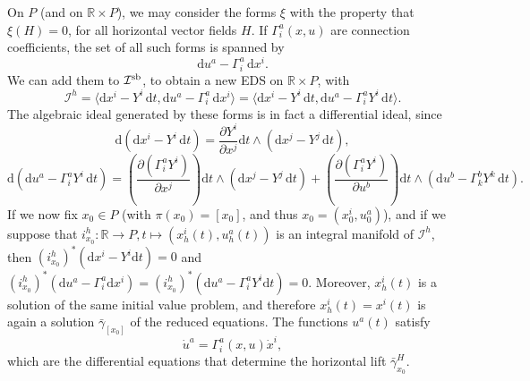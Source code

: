 \documentclass[11pt]{article}
\theoremstyle{plain}
\theoremstyle{definition}
\begin{document}
On $P$ (and on $\mathbb R \times P$), we may consider the forms $\xi$ with the property that $\xi(H)=0$, for all horizontal vector fields $H$. If $\Gamma^a_i(x,u)$ are connection coefficients, the set of all such forms is spanned by
\begin{equation*}
    {\mathrm d}u^a - \Gamma^a_i \, {\mathrm d}x^i.
\end{equation*}
We can add them to ${\mathcal I}^{\rm{sb}}$, to obtain a new EDS on $\mathbb R \times P$, with
\begin{equation*}
    {\mathcal I}^{h} = \langle   {\mathrm d}x^i-Y^i \, {\mathrm d}t,  {\mathrm d}u^a - \Gamma^a_i \, {\mathrm d}x^i\rangle =   \langle   {\mathrm d}x^i-Y^i \, {\mathrm d}t,  {\mathrm d}u^a - \Gamma^a_iY^i \, {\mathrm d}t\rangle .
\end{equation*}
The algebraic ideal generated by these forms is in fact a differential ideal, since
\begin{equation*}
    \mathrm{d}({\mathrm d}x^i-Y^i \, {\mathrm d}t) =  \frac{\partial Y^i}{\partial x^j}   {\mathrm d}t \wedge \left({\mathrm d}x^j-Y^j \, {\mathrm d}t\right),
\end{equation*}
\begin{equation*}
    {\mathrm d}\left( {\mathrm d}u^a - \Gamma^a_iY^i \, {\mathrm d}t \right) = \left( \frac{\partial (\Gamma^a_iY^i)}{\partial x^j} \right){\mathrm d}t \wedge \left({\mathrm d}x^j -Y^j \, {\mathrm d}t\right) +\left( \frac{\partial(\Gamma^a_iY^i)}{\partial u^b} \right){\mathrm d}t\wedge \left({\mathrm d}u^b - \Gamma^b_kY^k \, {\mathrm d}t\right). 
\end{equation*}
If we now fix $x_0\in P$ (with $\pi(x_0)=[x_0]$, and thus $x_0=(x^i_0,u^a_0)$), and if we suppose that $i^h_{x_0}\colon \mathbb R \to P, t \mapsto (x^i_h(t), u^a_h(t)) $ is an integral manifold of ${\mathcal I}^{h}$, then $(i^h_{x_0})^{\ast} ({\mathrm d}x^i-Y^i  {\mathrm d}t) = 0$ and $(i^h_{x_0})^{\ast} ({\mathrm d}u^a - \Gamma^a_i{\mathrm d}x^i) = (i^h_{x_0})^{\ast} ({\mathrm d}u^a - \Gamma^a_iY^i{\mathrm d}t)  = 0$. Moreover, $x^i_h(t)$ is a solution of the same initial value problem, and therefore $x^i_h(t)=x^i(t)$ is again a solution ${\bar\gamma}_{[x_0]}$ of the reduced equations. The functions $u^a(t)$ satisfy
\begin{equation*}
    {\dot u}^a = \Gamma^a_i(x,u){\dot x}^i,
\end{equation*}
which are the differential equations that determine the horizontal lift $\bar{\gamma}_{x_0}^H$.
\end{document}
